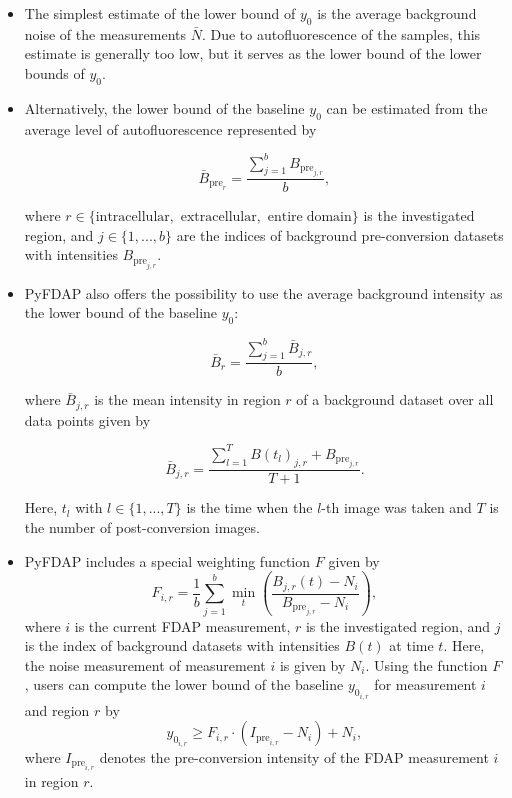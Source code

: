 \documentclass[a4paper,11pt]{article}
\begin{document}
\begin{itemize}

\item The simplest estimate of the lower bound of $y_0$ is the average background noise of the measurements $\bar{N}$. Due to autofluorescence of the samples, this estimate is generally too low, but it serves as the lower bound of the lower bounds of $y_0$.

\item Alternatively, the lower bound of the baseline $y_0$ can be estimated from the average level of autofluorescence represented by 

\begin{equation*}
 \bar{B}_{\mathrm{pre}_{r}} = \frac{\sum\limits_{j=1}^{b} B_{\mathrm{pre}_{j,r}}}{b},
\end{equation*}

\noindent where  $r\in \{\mathrm{intracellular,}$ $\mathrm{extracellular,}$ $\mathrm{entire \; domain}\}$ is the investigated region,  and $j \in \{ 1,...,b\}$ are the indices of background pre-conversion datasets with intensities $B_{\mathrm{pre}_{j,r}}$. 

\item PyFDAP also offers the possibility to use the average background intensity as the lower bound of the baseline $y_0$:

\begin{equation*}
 \bar{B}_{r} = \frac{\sum\limits_{j=1}^{b} \bar{B}_{j,r}}{b},
\end{equation*}

\noindent where $\bar{B}_{j,r}$ is the mean intensity in region $r$ of a background dataset over all data points given by 

\begin{equation*}
 \bar{B}_{j,r} = \frac{\sum\limits_{l=1}^{T} B(t_l)_{j,r}+ B_{\mathrm{pre}_{j,r}}}{T+1}.
\end{equation*}

Here, $t_l$ with $l\in \{1,...,T\}$ is the time when the $l$-th image was taken and $T$ is the number of post-conversion images.

\item PyFDAP includes a special weighting function $F$ \citep{Mueller2012} given by
\begin{equation*}
 F_{i,r} = \frac{1}{b}\sum\limits_{j=1}^{b} \min\limits_{t}\left(\frac{B_{j,r}(t)-N_i}{B_{\mathrm{pre}_{j,r}} - N_i} \right),
\end{equation*}
\noindent where $i$ is the current FDAP measurement, $r$ is the investigated region, and $j$ is the index of background datasets with intensities $B(t)$
at time $t$. Here, the noise measurement of measurement $i$ is given by $N_i$. Using the function $F$, users can compute the lower bound of the baseline $y_{{0}_{i,r}}$ for measurement $i$ and region $r$ by
\begin{equation*}
y_{{0}_{i,r}}\geq F_{i,r} \cdot (I_{\mathrm{pre}_{i,r}}-N_i)+N_i,
 \end{equation*}
\noindent where $I_{\mathrm{pre}_{i,r}}$ denotes the pre-conversion intensity of the FDAP measurement $i$ in region $r$.

\end{itemize}
\end{document}
